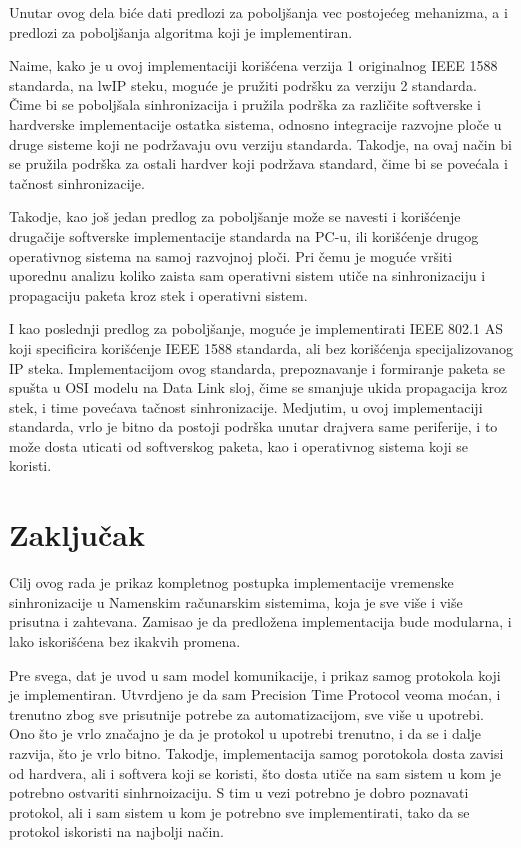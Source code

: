 \documentclass[a4paper,12pt, master]{etf}
\begin{document}
	Unutar ovog dela bi\'{c}e dati predlozi za pobolj\v{s}anja vec
	postoje\'{c}eg mehanizma, a i predlozi za pobolj\v{s}anja algoritma koji je
	implementiran.

	Naime, kako je u ovoj implementaciji kori\v{s}\'{c}ena verzija 1
	originalnog IEEE 1588 standarda, na lwIP steku, mogu\'{c}e je pru\v{z}iti
	podr\v{s}ku za verziju 2 standarda. \v{C}ime bi se pobolj\v{s}ala
	sinhronizacija i pru\v{z}ila podr\v{s}ka za razli\v{c}ite softverske i
	hardverske implementacije ostatka sistema, odnosno integracije razvojne
	plo\v{c}e u druge sisteme koji ne podr\v{z}avaju ovu verziju standarda.
	Takodje, na ovaj na\v{c}in bi se pru\v{z}ila podr\v{s}ka za ostali hardver
	koji podr\v{z}ava standard, \v{c}ime bi se pove\'{c}ala i ta\v{c}nost
	sinhronizacije.

	Takodje, kao jo\v{s} jedan predlog za pobolj\v{s}anje mo\v{z}e se navesti i
	kori\v{s}\'{c}enje druga\v{c}ije softverske implementacije standarda na
	PC-u, ili kori\v{s}\'{c}enje drugog operativnog sistema na samoj razvojnoj
	plo\v{c}i. Pri \v{c}emu je mogu\'{c}e vr\v{s}iti uporednu analizu koliko
	zaista sam operativni sistem uti\v{c}e na sinhronizaciju i propagaciju
	paketa kroz stek i operativni sistem.

	I kao poslednji predlog za pobolj\v{s}anje, mogu\'{c}e je implementirati
	IEEE 802.1 AS koji specificira kori\v{s}\'{c}enje IEEE 1588 standarda, ali
	bez kori\v{s}\'{c}enja specijalizovanog IP steka. Implementacijom ovog
	standarda, prepoznavanje i formiranje paketa se spu\v{s}ta u OSI modelu na
	Data Link sloj, \v{c}ime se smanjuje ukida propagacija kroz stek, i time
	pove\'{c}ava ta\v{c}nost sinhronizacije. Medjutim, u ovoj implementaciji
	standarda, vrlo je bitno da postoji podr\v{s}ka unutar drajvera same
	periferije, i to mo\v{z}e dosta uticati od softverskog paketa, kao i
	operativnog sistema koji se koristi.

	\newpage

	\chapter{Zaključak}

	Cilj ovog rada je prikaz kompletnog postupka implementacije vremenske
	sinhronizacije u Namenskim ra\v{c}unarskim sistemima, koja je sve vi\v{s}e
	i vi\v{s}e prisutna i zahtevana. Zamisao je da predlo\v{z}ena
	implementacija bude modularna, i lako iskori\v{s}\'{c}ena bez ikakvih
	promena.

	Pre svega, dat je uvod u sam model komunikacije, i prikaz samog protokola
	koji je implementiran. Utvrdjeno je da sam Precision Time Protocol veoma
	mo\'{c}an, i trenutno zbog sve prisutnije potrebe za automatizacijom, sve
	vi\v{s}e u upotrebi. Ono \v{s}to je vrlo zna\v{c}ajno je da je protokol u
	upotrebi trenutno, i da se i dalje razvija, \v{s}to je vrlo bitno. Takodje,
	implementacija samog porotokola dosta zavisi od hardvera, ali i softvera
	koji se koristi, \v{s}to dosta uti\v{c}e na sam sistem u kom je potrebno
	ostvariti sinhrnoizaciju. S tim u vezi potrebno je dobro poznavati protokol,
	 ali i sam sistem u kom je potrebno sve implementirati, tako da se protokol
	iskoristi na najbolji na\v{c}in.
\end{document}
